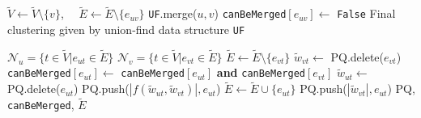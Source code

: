 \begin{algorithm}
\begin{algorithmic}[1]
          \State $\tilde{V} \gets \tilde{V} \setminus \{ v\}$, $\quad \tilde{E} \gets \tilde{E} \setminus \{ e_{uv}\}$ 
          \State \texttt{UF}.merge($u,v$) 
          \State \texttt{canBeMerged}$[e_{uv}] \gets$ \texttt{False} 
        \EndIf
      \EndWhile
      \State
      \Return Final clustering given by union-find data structure  \texttt{UF}
  \end{algorithmic}
  \hspace*{1.5cm} 
    \begin{algorithmic}[1]
      \State $\mathcal{N}_u = \{ t \in \tilde{V} | e_{ut}\in \tilde{E}  \}$
      \State $\mathcal{N}_v = \{ t \in \tilde{V} | e_{vt}\in \tilde{E}  \}$ 
       
        \State $\tilde{E} \gets \tilde{E} \setminus \{e_{vt}\}$
        \State $\tilde{w}_{vt} \gets$ PQ.delete($e_{vt}$) 
        \State \texttt{canBeMerged}$[e_{ut}] \gets$ \texttt{canBeMerged}$[e_{ut}]$ \textbf{and} \texttt{canBeMerged}$[e_{vt}]$
          \State $\tilde{w}_{ut} \gets$ PQ.delete($e_{ut}$)  
          \State PQ.push($ |f(\tilde{w}_{ut}, \tilde{w}_{vt})|, e_{ut}$) 
        \Else
          \State $\tilde{E} \gets \tilde{E} \cup \{e_{ut}\}$
          \State PQ.push($ |\tilde{w}_{vt}|, e_{ut}$) 
        \EndIf
      \EndFor
      \State
      \Return PQ, \texttt{canBeMerged}, $\tilde{E}$
    \EndFunction
  \end{algorithmic}
  \label{detailed_alg}
\end{algorithm}
